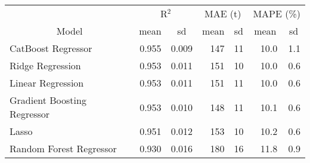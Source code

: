 
\begin{tabular}[t]{lrrrrrr}
\toprule
\multicolumn{1}{c}{ } & \multicolumn{2}{c}{R$^2$} & \multicolumn{2}{c}{MAE (t)} & \multicolumn{2}{c}{MAPE (\%)} \\
\cmidrule(l{3pt}r{3pt}){2-3} \cmidrule(l{3pt}r{3pt}){4-5} \cmidrule(l{3pt}r{3pt}){6-7}
\multicolumn{1}{c}{Model} & \multicolumn{1}{c}{mean} & \multicolumn{1}{c}{sd} & \multicolumn{1}{c}{mean} & \multicolumn{1}{c}{sd} & \multicolumn{1}{c}{mean} & \multicolumn{1}{c}{sd}\\
\midrule
CatBoost Regressor & 0.955 & 0.009 & 147 & 11 & 10.0 & 1.1\\
Ridge Regression & 0.953 & 0.011 & 151 & 10 & 10.0 & 0.6\\
Linear Regression & 0.953 & 0.011 & 151 & 11 & 10.0 & 0.6\\
Gradient Boosting Regressor & 0.953 & 0.010 & 148 & 11 & 10.1 & 0.6\\
Lasso & 0.951 & 0.012 & 153 & 10 & 10.2 & 0.6\\
Random Forest Regressor & 0.930 & 0.016 & 180 & 16 & 11.8 & 0.9\\
\bottomrule
\end{tabular}
